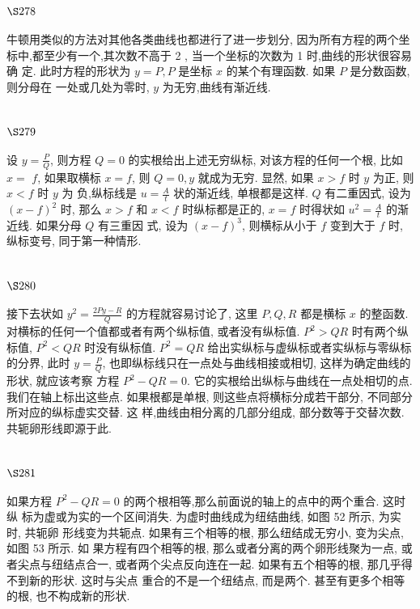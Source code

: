 \section{$\S 278$}

牛顿用类似的方法对其他各类曲线也都进行了进一步划分, 因为所有方程的两个坐 标中,都至少有一个,其次数不高于 2 , 当一个坐标的次数为 1 时,曲线的形状很容易确 定. 此时方程的形状为 $y=P, P$ 是坐标 $x$ 的某个有理函数. 如果 $P$ 是分数函数, 则分母在 一处或几处为零时, $y$ 为无穷,曲线有渐近线.

\section{$\S 279$}

设 $y=\frac{P}{Q}$, 则方程 $Q=0$ 的实根给出上述无穷纵标, 对该方程的任何一个根, 比如 $x=$ $f$, 如果取横标 $x=f$, 则 $Q=0, y$ 就成为无穷. 显然, 如果 $x>f$ 时 $y$ 为正, 则 $x<f$ 时 $y$ 为 负,纵标线是 $u=\frac{A}{t}$ 状的渐近线, 单根都是这样. $Q$ 有二重因式, 设为 $(x-f)^{2}$ 时, 那么 $x>f$ 和 $x<f$ 时纵标都是正的, $x=f$ 时得状如 $u^{2}=\frac{A}{t}$ 的渐近线. 如果分母 $Q$ 有三重因 式, 设为 $(x-f)^{3}$, 则横标从小于 $f$ 变到大于 $f$ 时, 纵标变号, 同于第一种情形.

\section{$\S 280$}

接下去状如 $y^{2}=\frac{2 P y-R}{Q}$ 的方程就容易讨论了, 这里 $P, Q, R$ 都是横标 $x$ 的整函数. 对横标的任何一个值都或者有两个纵标值, 或者没有纵标值. $P^{2}>Q R$ 时有两个纵标值, $P^{2}<Q R$ 时没有纵标值. $P^{2}=Q R$ 给出实纵标与虚纵标或者实纵标与零纵标的分界, 此时 $y=\frac{P}{Q}$, 也即纵标线只在一点处与曲线相接或相切, 这样为确定曲线的形状, 就应该考察 方程 $P^{2}-Q R=0$. 它的实根给出纵标与曲线在一点处相切的点. 我们在轴上标出这些点. 如果根都是单根, 则这些点将横标分成若干部分, 不同部分所对应的纵标虚实交替. 这 样,曲线由相分离的几部分组成, 部分数等于交替次数. 共轭卵形线即源于此.

\section{$\S 281$}

如果方程 $P^{2}-Q R=0$ 的两个根相等,那么前面说的轴上的点中的两个重合. 这时纵 标为虚或为实的一个区间消失. 为虚时曲线成为纽结曲线, 如图 52 所示, 为实时, 共轭卵 形线变为共轭点. 如果有三个相等的根, 那么纽结成无穷小, 变为尖点, 如图 53 所示. 如 果方程有四个相等的根, 那么或者分离的两个卵形线聚为一点, 或者尖点与纽结点合一, 或者两个尖点反向连在一起. 如果有五个相等的根, 那几乎得不到新的形状. 这时与尖点 重合的不是一个纽结点, 而是两个. 甚至有更多个相等的根, 也不构成新的形状.

